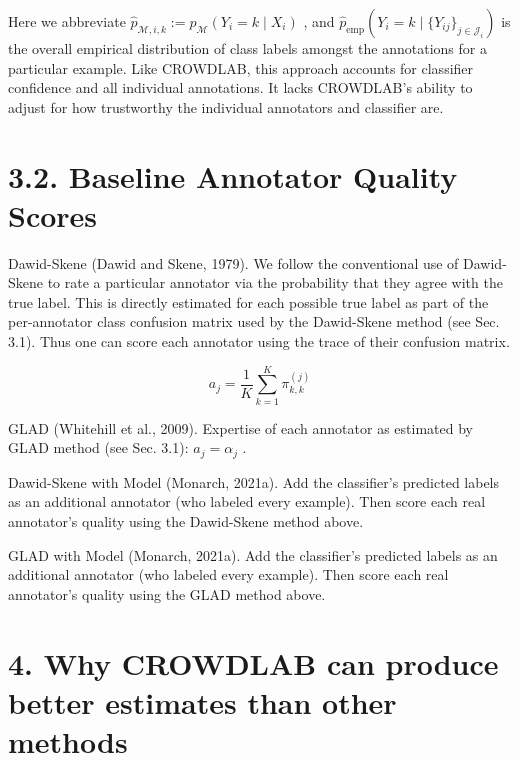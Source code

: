 \documentclass[
]{article}
\begin{document}
Here we abbreviate
\(\widehat{p}_{\mathcal{M},i,k} := \widehat{p}_{\mathcal{M}}(Y_i = k \mid X_i)\)
, and
\(\widehat{p}_{\mathrm{emp}}(Y_i = k \mid \{Y_{ij}\}_{j \in \mathcal{J}_i})\)
is the overall empirical distribution of class labels amongst the
annotations for a particular example. Like CROWDLAB, this approach
accounts for classifier confidence and all individual annotations. It
lacks CROWDLAB's ability to adjust for how trustworthy the individual
annotators and classifier are.

\section{3.2. Baseline Annotator Quality
Scores}\label{baseline-annotator-quality-scores}

Dawid-Skene (Dawid and Skene, 1979). We follow the conventional use of
Dawid-Skene to rate a particular annotator via the probability that they
agree with the true label. This is directly estimated for each possible
true label as part of the per-annotator class confusion matrix used by
the Dawid-Skene method (see Sec. 3.1). Thus one can score each annotator
using the trace of their confusion matrix.

\[
a _ {j} = \frac {1}{K} \sum_ {k = 1} ^ {K} \pi_ {k, k} ^ {(j)} \tag {19}
\]

GLAD (Whitehill et al., 2009). Expertise of each annotator as estimated
by GLAD method (see Sec. 3.1): \(a_{j} = \alpha_{j}\) .

Dawid-Skene with Model (Monarch, 2021a). Add the classifier's predicted
labels as an additional annotator (who labeled every example). Then
score each real annotator's quality using the Dawid-Skene method above.

GLAD with Model (Monarch, 2021a). Add the classifier's predicted labels
as an additional annotator (who labeled every example). Then score each
real annotator's quality using the GLAD method above.

\section{4. Why CROWDLAB can produce better estimates than other
methods}\label{why-crowdlab-can-produce-better-estimates-than-other-methods}
\end{document}
